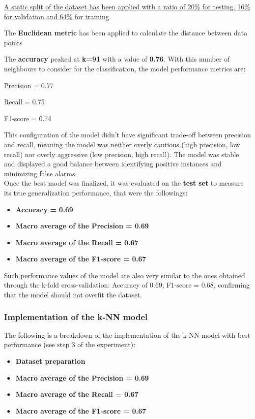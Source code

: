 \documentclass[11pt,a4paper]{article}
\newcommand{\SubItem}[1]{
  {\setlength\itemindent{13pt} \item[◦] #1}
}
\begin{document}
\begin{itemize}
\item \uline{A static split of the dataset has been applied with a ratio of 20\% for testing, 16\% for validation and 64\% for training}.
\item The \textbf{Euclidean metric} has been applied to calculate the distance between data points
\item The \textbf{accuracy} peaked at \textbf{k=91} with a value of \textbf{0.76}. With this number of neighbours to consider for the classification, the model performance metrics are:
\SubItem{Precision = 0.77}
\SubItem{Recall = 0.75}
\SubItem{F1-score = 0.74}
\end{itemize}
This configuration of the model didn’t have significant trade-off between precision and recall, meaning the model was neither overly cautious (high precision, low recall) nor overly aggressive (low precision, high recall). The model was stable and displayed a good balance between identifying positive instances and minimizing false alarms.\\
Once the best model was finalized, it was evaluated on the \textbf{test set} to measure its true generalization performance, that were the followings:
\begin{itemize}
\item \textbf{Accuracy = 0.69} 
\item \textbf{Macro average of the Precision = 0.69} 
\item \textbf{Macro average of the Recall = 0.67} 
\item \textbf{Macro average of the F1-score = 0.67} 
\end{itemize}
Such performance values of the model are also very similar to the ones obtained through the k-fold cross-validation: Accuracy of 0.69; F1-score = 0.68, confirming that the model should not overfit the dataset.
\\
\subsubsection{Implementation of the k-NN model} 
The following is a breakdown of the implementation of the k-NN model with best performance (see step 3 of the experiment):

\begin{itemize}
\item \textbf{Dataset preparation} 
















\item \textbf{Macro average of the Precision = 0.69} 
\item \textbf{Macro average of the Recall = 0.67} 
\item \textbf{Macro average of the F1-score = 0.67} 
\end{itemize}
\end{document}
